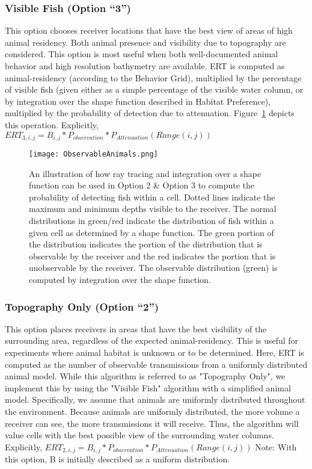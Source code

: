 \subsubsection{Visible Fish (Option “3”)}
\label{bias3}
This option chooses receiver locations that have the best view of areas of high animal residency.  Both animal presence and visibility due to topography are considered. This option is most useful when both well-documented animal behavior and high resolution bathymetry are available.  ERT is computed as animal-residency (according to the Behavior Grid), multiplied by the percentage of visible fish (given either as a simple percentage of the visible water column, or by integration over the shape function described in Habitat Preference), multiplied by the probability of detection due to attenuation.  Figure~\ref{observableAnimals} depicts this operation.\newline
Explicitly,
$ERT_{3,i,j} =  B_{i,j} * P_{observation} * P_{Attenuation}(Range(i,j))$

\begin{figure}[ht]
	\centering
	\texttt{[image: ObservableAnimals.png]}
	\caption{An illustration of how ray tracing and integration over a shape function can be used in Option 2 \& Option 3 to compute the probability of detecting fish within a cell.  Dotted lines indicate the maximum and minimum depths visible to the receiver.  The normal distributions in green/red indicate the distribution of fish within a given cell as determined by a shape function.  The green portion of the distribution indicates the portion of the distribution that is observable by the receiver and the red indicates the portion that is unobservable by the receiver.  The observable distribution (green) is computed by integration over the shape function.
		\label{observableAnimals}}
\end{figure}

\subsubsection{Topography Only (Option “2”)}
\label{bias2}
This option places receivers in areas that have the best visibility of the surrounding area, regardless of the expected animal-residency.  This is useful for experiments where animal habitat is unknown or to be determined.  Here, ERT is computed as the number of observable transmissions from a uniformly distributed animal model.  While this algorithm is referred to as "Topography Only", we implement this by using the "Visible Fish" algorithm with a simplified animal model.  Specifically, we assume that animals are uniformly distributed throughout the environment.  Because animals are uniformly distributed, the more volume a receiver can see, the more transmissions it will receive.  Thus, the algorithm will value cells with the best possible view of the surrounding water columns.\newline
Explicitly,
$ERT_{2,i,j} =  B_{i,j} * P_{observation} * P_{Attenuation}(Range(i,j))$\newline
Note: With this option, B is initially described as a uniform distribution.


